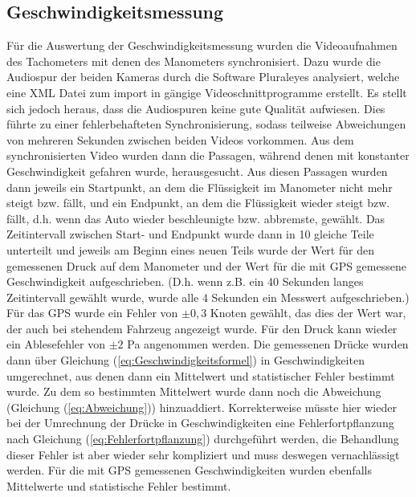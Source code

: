 \subsection{Geschwindigkeitsmessung}
Für die Auswertung der Geschwindigkeitsmessung wurden die Videoaufnahmen des Tachometers mit denen des Manometers synchronisiert. Dazu wurde die Audiospur der beiden Kameras durch die Software Pluraleyes analysiert, welche eine XML Datei zum import in gängige Videoschnittprogramme erstellt. Es stellt sich jedoch heraus, dass die Audiospuren keine gute Qualität aufwiesen. Dies führte zu einer fehlerbehafteten Synchronisierung, sodass teilweise Abweichungen von mehreren Sekunden zwischen beiden Videos vorkommen.
Aus dem synchronisierten Video wurden dann die Passagen, während denen mit konstanter Geschwindigkeit gefahren wurde, herausgesucht. Aus diesen Passagen wurden dann jeweils ein Startpunkt, an dem die Flüssigkeit im Manometer nicht mehr steigt bzw. fällt, und ein Endpunkt, an dem die Flüssigkeit wieder steigt bzw. fällt, d.h. wenn das Auto wieder beschleunigte bzw. abbremste, gewählt. Das Zeitintervall zwischen Start- und Endpunkt wurde dann in 10 gleiche Teile unterteilt und jeweils am Beginn eines neuen Teils wurde der Wert für den gemessenen Druck auf dem Manometer und der Wert für die mit GPS gemessene Geschwindigkeit aufgeschrieben. (D.h. wenn z.B. ein 40 Sekunden langes Zeitintervall gewählt wurde, wurde alle 4 Sekunden ein Messwert aufgeschrieben.)
\\
Für das GPS wurde ein Fehler von $\pm 0,3$ Knoten gewählt, das dies der Wert war, der auch bei stehendem Fahrzeug angezeigt wurde. Für den Druck kann wieder ein Ablesefehler von $\pm 2$ Pa angenommen werden. Die gemessenen Drücke wurden dann über Gleichung (\ref{eq:Geschwindigkeitsformel}) in Geschwindigkeiten umgerechnet, aus denen dann ein Mittelwert und statistischer Fehler bestimmt wurde. Zu dem so bestimmten Mittelwert wurde dann noch die Abweichung (Gleichung (\ref{eq:Abweichung})) hinzuaddiert. Korrekterweise müsste hier wieder bei der Umrechnung der Drücke in Geschwindigkeiten eine Fehlerfortpflanzung nach Gleichung (\ref{eq:Fehlerfortpflanzung}) durchgeführt werden, die Behandlung dieser Fehler ist aber wieder sehr kompliziert und muss deswegen vernachlässigt werden. Für die mit GPS gemessenen Geschwindigkeiten wurden ebenfalls Mittelwerte und statistische Fehler bestimmt.
\\
